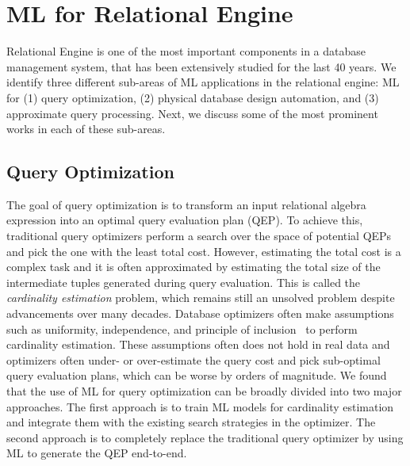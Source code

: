 \section{ML for Relational Engine}
Relational Engine is one of the most important components in a database management system,  that has been extensively studied for the last 40 years.
We identify three different sub-areas of ML applications in the relational engine: ML for (1) query optimization, (2) physical database design automation, and (3) approximate query processing.
Next, we discuss some of the most prominent works in each of these sub-areas.

\subsection{Query Optimization}
The goal of query optimization is to transform an input relational algebra expression into an optimal query evaluation plan (QEP).
To achieve this, traditional query optimizers perform a search over the space of potential QEPs and pick the one with the least total cost.
However, estimating the total cost is a complex task and it is often approximated by estimating the total size of the intermediate tuples generated during query evaluation.
This is called the \textit{cardinality estimation} problem, which remains still an unsolved problem despite advancements over many decades. 
Database optimizers often make assumptions such as uniformity, independence, and principle of inclusion~\cite{leis2018query} to perform cardinality estimation.
These assumptions often does not hold in real data and optimizers often under- or over-estimate the query cost and pick sub-optimal query evaluation plans, which can be worse by orders of magnitude.
We found that the use of ML for query optimization can be broadly divided into two major approaches.
The first approach is to train ML models for cardinality estimation and integrate them with the existing search strategies in the optimizer.
The second approach is to completely replace the traditional query optimizer by using ML to generate the QEP end-to-end.

